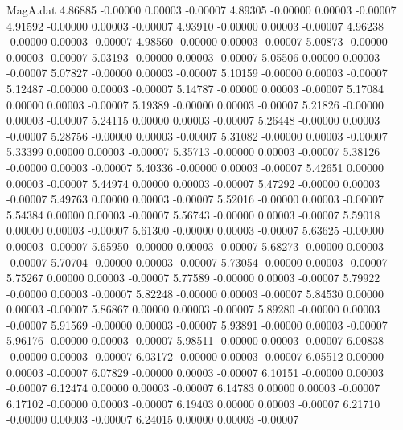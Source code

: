 \begin{filecontents}{MagA.dat}
   4.86885   -0.00000    0.00003   -0.00007
   4.89305   -0.00000    0.00003   -0.00007
   4.91592   -0.00000    0.00003   -0.00007
   4.93910   -0.00000    0.00003   -0.00007
   4.96238   -0.00000    0.00003   -0.00007
   4.98560   -0.00000    0.00003   -0.00007
   5.00873   -0.00000    0.00003   -0.00007
   5.03193   -0.00000    0.00003   -0.00007
   5.05506    0.00000    0.00003   -0.00007
   5.07827   -0.00000    0.00003   -0.00007
   5.10159   -0.00000    0.00003   -0.00007
   5.12487   -0.00000    0.00003   -0.00007
   5.14787   -0.00000    0.00003   -0.00007
   5.17084    0.00000    0.00003   -0.00007
   5.19389   -0.00000    0.00003   -0.00007
   5.21826   -0.00000    0.00003   -0.00007
   5.24115    0.00000    0.00003   -0.00007
   5.26448   -0.00000    0.00003   -0.00007
   5.28756   -0.00000    0.00003   -0.00007
   5.31082   -0.00000    0.00003   -0.00007
   5.33399    0.00000    0.00003   -0.00007
   5.35713   -0.00000    0.00003   -0.00007
   5.38126   -0.00000    0.00003   -0.00007
   5.40336   -0.00000    0.00003   -0.00007
   5.42651    0.00000    0.00003   -0.00007
   5.44974    0.00000    0.00003   -0.00007
   5.47292   -0.00000    0.00003   -0.00007
   5.49763    0.00000    0.00003   -0.00007
   5.52016   -0.00000    0.00003   -0.00007
   5.54384    0.00000    0.00003   -0.00007
   5.56743   -0.00000    0.00003   -0.00007
   5.59018    0.00000    0.00003   -0.00007
   5.61300   -0.00000    0.00003   -0.00007
   5.63625   -0.00000    0.00003   -0.00007
   5.65950   -0.00000    0.00003   -0.00007
   5.68273   -0.00000    0.00003   -0.00007
   5.70704   -0.00000    0.00003   -0.00007
   5.73054   -0.00000    0.00003   -0.00007
   5.75267    0.00000    0.00003   -0.00007
   5.77589   -0.00000    0.00003   -0.00007
   5.79922   -0.00000    0.00003   -0.00007
   5.82248   -0.00000    0.00003   -0.00007
   5.84530    0.00000    0.00003   -0.00007
   5.86867    0.00000    0.00003   -0.00007
   5.89280   -0.00000    0.00003   -0.00007
   5.91569   -0.00000    0.00003   -0.00007
   5.93891   -0.00000    0.00003   -0.00007
   5.96176   -0.00000    0.00003   -0.00007
   5.98511   -0.00000    0.00003   -0.00007
   6.00838   -0.00000    0.00003   -0.00007
   6.03172   -0.00000    0.00003   -0.00007
   6.05512    0.00000    0.00003   -0.00007
   6.07829   -0.00000    0.00003   -0.00007
   6.10151   -0.00000    0.00003   -0.00007
   6.12474    0.00000    0.00003   -0.00007
   6.14783    0.00000    0.00003   -0.00007
   6.17102   -0.00000    0.00003   -0.00007
   6.19403    0.00000    0.00003   -0.00007
   6.21710   -0.00000    0.00003   -0.00007
   6.24015    0.00000    0.00003   -0.00007

\end{filecontents}

